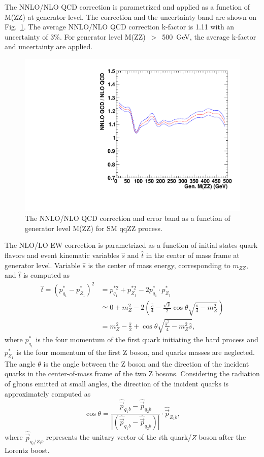 \vspace{0.3cm}
The NNLO/NLO QCD correction is parametrized and applied as a function of M(ZZ) 
at generator level. 
The correction and the uncertainty band are shown on Fig.~\ref{fig:qqzz_nnlo_qcd}.
The average NNLO/NLO QCD correction k-factor is 1.11 with an uncertainty of 3\%.
For generator level M(ZZ)~$>$~500~GeV, the average k-factor and uncertainty are applied. 

\begin{figure}[htbp!]
\centering
  \includegraphics[width=0.48\linewidth]{figures/h_nnlo_to_nlo_vs_mzz.pdf}
  \caption{The NNLO/NLO QCD correction and error band as a function of generator level M(ZZ) for SM qqZZ process.}
  \label{fig:qqzz_nnlo_qcd}
\end{figure}

\vspace{0.3cm}
The NLO/LO EW correction is parametrized as a function of initial states quark flavors and event kinematic variables $\hat{s}$ and $\hat{t}$
in the center of mass frame at generator level. 
Variable $\hat{s}$ is the center of mass energy, corresponding to $m_{ZZ}$,
and $\hat{t}$ is computed as
\begin{align*}
\hat{t} = \left(p^*_{q_1}-p^*_{Z_1}\right)^2 & = p_{q_1}^{*2} +
p_{Z_1}^{*2} - 2 p^*_{q_1} \cdot p^*_{Z_1} \\
& \simeq 0 + m_{Z}^{2} - 2 \left( \frac{\hat{s}}{4} -
\frac{\sqrt{\hat{s}}}{2} \cos{\theta} \sqrt{\frac{\hat{s}}{4} -
m_{Z}^{2}} \right) \\
& = m_{Z}^{2} - \frac{\hat{s}}{2} + \cos{\theta}
\sqrt{\frac{\hat{s}^2}{4} - m_{Z}^{2}\hat{s}},
\end{align*}
where $p^*_{q_1}$ is the four momentum of the first quark initiating the hard process and 
$p^*_{Z_1}$  is the four momentum of the first Z boson, and quarks masses are neglected.
The angle $\theta$ is the angle between the Z boson and the direction of the
incident quarks in the center-of-mass frame of the two Z bosons. 
Considering the radiation of gluons emitted at small angles, the direction of the incident
quarks is approximately computed as 
\begin{equation*}
\cos{\theta} = \frac{\hat{\vec{p}}_{q_1b} -
\hat{\vec{p}}_{q_2b}}{\left|\left( \hat{\vec{p}}_{q_1b} -
\hat{\vec{p}}_{q_2b} \right)\right|} \cdot \hat{\vec{p}}_{Z_1b},
\end{equation*}
where $\hat{\vec{p}}_{q_i/Z_ib}$ represents the unitary vector of the
$i$th quark/$Z$ boson after the Lorentz boost. 

